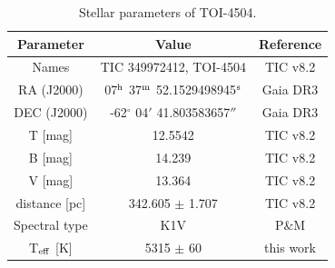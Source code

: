 \documentclass[twocolumn,twocolappendix]{aastex631}
\begin{document}
\begin{table}[ht!]
\caption{Stellar parameters of TOI-4504.}
\centering
\label{star_params}
\begin{tabular}{ccc}
 \hline 
  \hline
Parameter     & Value                   & Reference                        \\ \hline
Names         & TIC 349972412, TOI-4504 & TIC v8.2                             \\
RA (J2000)            & 07$^{\rm{h}}$ 37$^{\rm{m}}$ 52.1529498945$^{\rm{s}}$      & Gaia DR3                         \\
DEC (J2000)           & -62$^{\circ}$ 04$'$ 41.803583657$''$	      & Gaia DR3                         \\
T [mag]            & 12.5542                 & TIC v8.2                         \\
B [mag]            & 14.239                  & TIC v8.2                         \\
V [mag]            & 13.364                  & TIC v8.2                         \\
distance [pc]     & 342.605 ${\pm}$ 1.707      & TIC v8.2                         \\
Spectral type & K1V                     & P\&M \\
T$_{\rm{eff}}$ [K]         & 5315 ${\pm}$ 60             & this work                         \\

\end{tabular}
\end{table}
\end{document}
